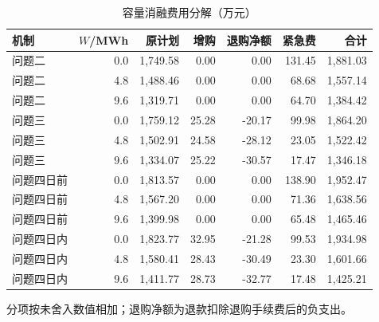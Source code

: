 \begin{table}[H]\centering\small
\caption{容量消融费用分解（万元）}\label{tab:capacityparts}
\begin{tabular}{lrrrrrr}\toprule
机制& $W$/MWh & 原计划 & 增购 & 退购净额 & 紧急费 & 合计\\\midrule
问题二&0.0&1,749.58&0.00&0.00&131.45&1,881.03\\
问题二&4.8&1,488.46&0.00&0.00&68.68&1,557.14\\
问题二&9.6&1,319.71&0.00&0.00&64.70&1,384.42\\
问题三&0.0&1,759.12&25.28&-20.17&99.98&1,864.20\\
问题三&4.8&1,502.91&24.58&-28.12&23.05&1,522.42\\
问题三&9.6&1,334.07&25.22&-30.57&17.47&1,346.18\\
问题四日前&0.0&1,813.57&0.00&0.00&138.90&1,952.47\\
问题四日前&4.8&1,567.20&0.00&0.00&71.36&1,638.56\\
问题四日前&9.6&1,399.98&0.00&0.00&65.48&1,465.46\\
问题四日内&0.0&1,823.77&32.95&-21.28&99.53&1,934.98\\
问题四日内&4.8&1,580.41&28.43&-30.49&23.30&1,601.66\\
问题四日内&9.6&1,411.77&28.73&-32.77&17.48&1,425.21\\
\bottomrule\end{tabular}
\par\footnotesize 分项按未舍入数值相加；退购净额为退款扣除退购手续费后的负支出。
\end{table}
